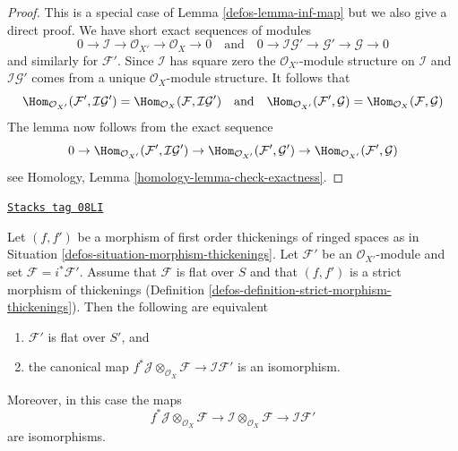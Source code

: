 \begin{proof}

This is a special case of Lemma \ref{defos-lemma-inf-map} but we also
give a direct proof. We have short exact sequences of modules
$$
0 \to \mathcal{I} \to \mathcal{O}_{X'} \to \mathcal{O}_X \to 0
\quad\text{and}\quad
0 \to \mathcal{I}\mathcal{G}' \to \mathcal{G}' \to \mathcal{G} \to 0
$$
and similarly for $\mathcal{F}'$.
Since $\mathcal{I}$ has square zero the $\mathcal{O}_{X'}$-module
structure on $\mathcal{I}$ and $\mathcal{I}\mathcal{G}'$ comes from
a unique $\mathcal{O}_X$-module structure. It follows that
$$
\Hom_{\mathcal{O}_{X'}}(\mathcal{F}', \mathcal{I}\mathcal{G}') =
\Hom_{\mathcal{O}_X}(\mathcal{F}, \mathcal{I}\mathcal{G}')
\quad\text{and}\quad
\Hom_{\mathcal{O}_{X'}}(\mathcal{F}', \mathcal{G}) =
\Hom_{\mathcal{O}_X}(\mathcal{F}, \mathcal{G})
$$
The lemma now follows from the exact sequence
$$
0 \to \Hom_{\mathcal{O}_{X'}}(\mathcal{F}', \mathcal{I}\mathcal{G}') \to
\Hom_{\mathcal{O}_{X'}}(\mathcal{F}', \mathcal{G}') \to
\Hom_{\mathcal{O}_{X'}}(\mathcal{F}', \mathcal{G})
$$
see Homology, Lemma \ref{homology-lemma-check-exactness}.
\end{proof}

\begin{lemma}
\label{defos-lemma-deform-module}
\href{https://stacks.math.columbia.edu/tag/08LI}{\texttt{Stacks tag 08LI}}

Let $(f, f')$ be a morphism of first order thickenings of ringed spaces
as in Situation \ref{defos-situation-morphism-thickenings}.
Let $\mathcal{F}'$ be an $\mathcal{O}_{X'}$-module
and set $\mathcal{F} = i^*\mathcal{F}'$.
Assume that $\mathcal{F}$ is flat over $S$
and that $(f, f')$ is a strict morphism of thickenings
(Definition \ref{defos-definition-strict-morphism-thickenings}).
Then the following are equivalent
\begin{enumerate}
\item $\mathcal{F}'$ is flat over $S'$, and
\item the canonical map
$f^*\mathcal{J} \otimes_{\mathcal{O}_X} \mathcal{F} \to
\mathcal{I}\mathcal{F}'$
is an isomorphism.
\end{enumerate}
Moreover, in this case the maps
$$
f^*\mathcal{J} \otimes_{\mathcal{O}_X} \mathcal{F} \to
\mathcal{I} \otimes_{\mathcal{O}_X} \mathcal{F} \to
\mathcal{I}\mathcal{F}'
$$
are isomorphisms.
\end{lemma}

